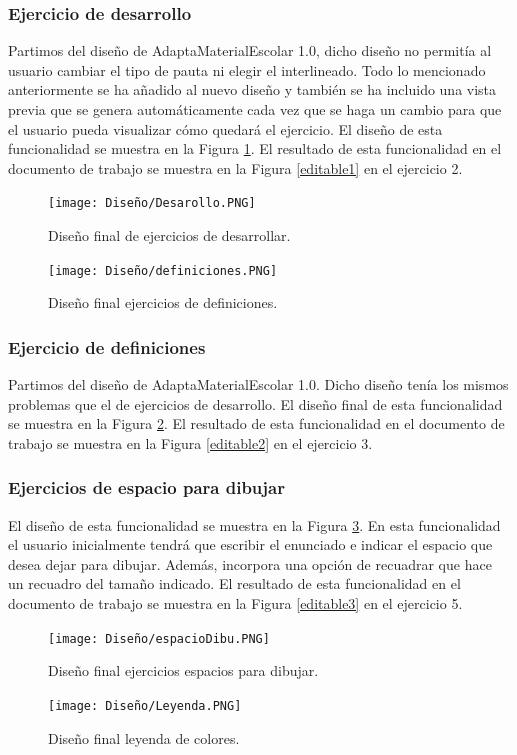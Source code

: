 \subsubsection{Ejercicio de desarrollo}
Partimos del diseño de AdaptaMaterialEscolar 1.0, dicho diseño no permitía al usuario cambiar el tipo de pauta ni elegir el interlineado. Todo lo mencionado anteriormente se ha añadido al nuevo diseño y también se ha incluido una vista previa que se genera automáticamente cada vez que se haga un cambio para que el usuario pueda visualizar cómo quedará el ejercicio. El diseño de esta funcionalidad se muestra en la Figura \ref{DesarrolloFinal}. El resultado de esta funcionalidad en el documento de trabajo se muestra en la Figura \ref{editable1} en el ejercicio 2.

\begin{figure}[ht!]
  \centering
  \texttt{[image: Diseño/Desarollo.PNG]}
  \caption{Diseño final de ejercicios de desarrollar.}
  \label{DesarrolloFinal}
\end{figure}

\begin{figure}[ht!]
  \centering
  \texttt{[image: Diseño/definiciones.PNG]}
  \caption{Diseño final ejercicios de definiciones.}
  \label{defi}
\end{figure}

\subsubsection{Ejercicio de definiciones}
Partimos del diseño de AdaptaMaterialEscolar 1.0. Dicho diseño tenía los mismos problemas que el de ejercicios de desarrollo. El diseño final de esta funcionalidad se muestra en la Figura \ref{defi}. El resultado de esta funcionalidad en el documento de trabajo se muestra en la Figura \ref{editable2} en el ejercicio 3.


\subsubsection{Ejercicios de espacio para dibujar}
El diseño de esta funcionalidad se muestra en la Figura \ref{espaciosDibu}. En esta funcionalidad el usuario inicialmente tendrá que escribir el enunciado e indicar el espacio que desea dejar para dibujar. Además, incorpora una opción de recuadrar que hace un recuadro del tamaño indicado. El resultado de esta funcionalidad en el documento de trabajo se muestra en la Figura \ref{editable3} en el ejercicio 5.
\begin{figure}[ht!]
  \centering
  \texttt{[image: Diseño/espacioDibu.PNG]}
  \caption{Diseño final ejercicios espacios para dibujar.}
  \label{espaciosDibu}
\end{figure}
\begin{figure}[ht!]
  \centering
  \texttt{[image: Diseño/Leyenda.PNG]}
  \caption{Diseño final leyenda de colores.}
  \label{LeyendaColores}
\end{figure}



